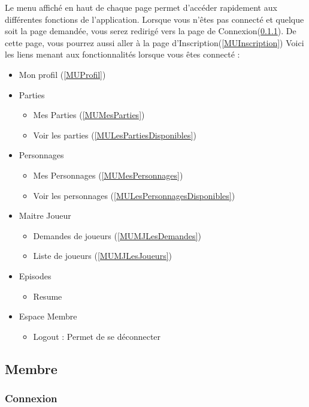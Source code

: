 \documentclass[a4paper,oneside,10pt]{article}
\begin{document}
Le menu affiché en haut de chaque page permet d'accéder rapidement aux différentes fonctions de l'application. Lorsque vous n'êtes pas connecté et quelque soit la page demandée, vous serez redirigé vers la page de Connexion(\ref{MUConnexion}). De cette page, vous pourrez aussi aller à la page d'Inscription(\ref{MUInscription})
Voici les liens menant aux fonctionnalités lorsque vous êtes connecté :
\begin{itemize}
	\item Mon profil (\ref{MUProfil})
	\item Parties
	\begin{itemize}
		\item Mes Parties (\ref{MUMesParties})
		\item Voir les parties (\ref{MULesPartiesDisponibles})
	\end{itemize}
	\item Personnages
	\begin{itemize}
		\item Mes Personnages (\ref{MUMesPersonnages})
		\item Voir les personnages (\ref{MULesPersonnagesDisponibles})
	\end{itemize}
	\item Maitre Joueur
	\begin{itemize}
		\item Demandes de joueurs (\ref{MUMJLesDemandes})
		\item Liste de joueurs (\ref{MUMJLesJoueurs})
	\end{itemize}
	\item Episodes 
	\begin{itemize}
		\item Resume
	\end{itemize}
	\item Espace Membre
	\begin{itemize}
		\item Logout : Permet de se déconnecter
	\end{itemize}
\end{itemize}

\subsection{Membre}

\subsubsection{Connexion}
\label{MUConnexion}
\end{document}
